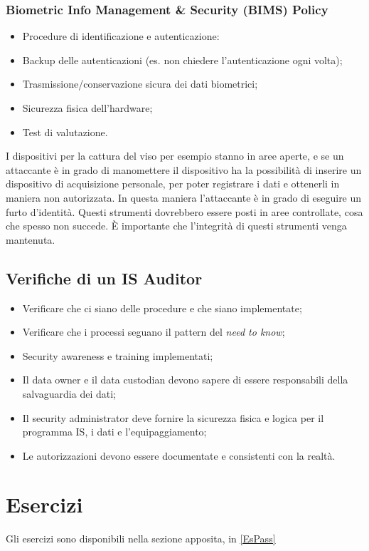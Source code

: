 \subsubsection{Biometric Info Management \& Security (BIMS) Policy}

\begin{itemize}
 \item Procedure di identificazione e autenticazione:
 \item Backup delle autenticazioni (es. non chiedere l'autenticazione ogni
 volta);
 \item Trasmissione/conservazione sicura dei dati biometrici;
 \item Sicurezza fisica dell'hardware;
 \item Test di valutazione.
\end{itemize}

I dispositivi per la cattura del viso per esempio stanno in aree aperte, e se
un attaccante è in grado di manomettere il dispositivo ha la possibilità di
inserire un dispositivo di acquisizione personale, per poter registrare i dati
e ottenerli in maniera non autorizzata. In questa maniera l'attaccante è in
grado di eseguire un furto d'identità. Questi strumenti dovrebbero essere posti
in aree controllate, cosa che spesso non succede. È importante che l'integrità
di questi strumenti venga mantenuta.

\subsection{Verifiche di un IS Auditor}
\begin{itemize}
 \item Verificare che ci siano delle procedure e che siano implementate;
 \item Verificare che i processi seguano il pattern del \textit{need to know};
 \item Security awareness e training implementati;
 \item Il data owner e il data custodian devono sapere di essere responsabili 
 della salvaguardia dei dati;
 \item Il security administrator deve fornire la sicurezza fisica e logica per 
 il programma IS, i dati e l'equipaggiamento;
 \item Le autorizzazioni devono essere documentate e consistenti con la realtà.
\end{itemize}


\section{Esercizi}

Gli esercizi sono disponibili nella sezione apposita, in \ref{EsPass}
